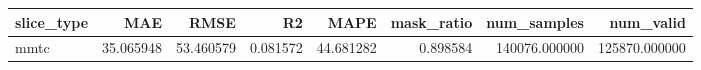 \begin{tabular}{lrrrrrrr}
\toprule
slice_type & MAE & RMSE & R2 & MAPE & mask_ratio & num_samples & num_valid \\
\midrule
mmtc & 35.065948 & 53.460579 & 0.081572 & 44.681282 & 0.898584 & 140076.000000 & 125870.000000 \\
\bottomrule
\end{tabular}
